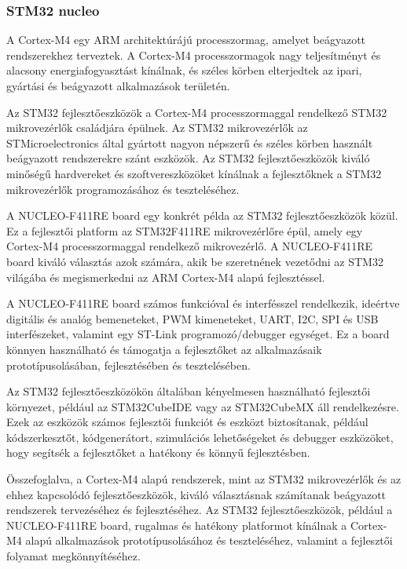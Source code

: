 \subsubsection{STM32 nucleo}
A Cortex-M4 egy ARM architektúrájú processzormag, amelyet beágyazott rendszerekhez terveztek. A Cortex-M4 processzormagok nagy teljesítményt és alacsony energiafogyasztást kínálnak, és széles körben elterjedtek az ipari, gyártási és beágyazott alkalmazások területén.

Az STM32 fejlesztőeszközök a Cortex-M4 processzormaggal rendelkező STM32 mikrovezérlők családjára épülnek. Az STM32 mikrovezérlők az STMicroelectronics által gyártott nagyon népszerű és széles körben használt beágyazott rendszerekre szánt eszközök. Az STM32 fejlesztőeszközök kiváló minőségű hardvereket és szoftvereszközöket kínálnak a fejlesztőknek a STM32 mikrovezérlők programozásához és teszteléséhez.

A NUCLEO-F411RE board egy konkrét példa az STM32 fejlesztőeszközök közül. Ez a fejlesztői platform az STM32F411RE mikrovezérlőre épül, amely egy Cortex-M4 processzormaggal rendelkező mikrovezérlő. A NUCLEO-F411RE board kiváló választás azok számára, akik be szeretnének vezetődni az STM32 világába és megismerkedni az ARM Cortex-M4 alapú fejlesztéssel.

A NUCLEO-F411RE board számos funkcióval és interfésszel rendelkezik, ideértve digitális és analóg bemeneteket, PWM kimeneteket, UART, I2C, SPI és USB interfészeket, valamint egy ST-Link programozó/debugger egységet. Ez a board könnyen használható és támogatja a fejlesztőket az alkalmazásaik prototípusolásában, fejlesztésében és tesztelésében.

Az STM32 fejlesztőeszközökön általában kényelmesen használható fejlesztői környezet, például az STM32CubeIDE vagy az STM32CubeMX áll rendelkezésre. Ezek az eszközök számos fejlesztői funkciót és eszközt biztosítanak, például kódszerkesztőt, kódgenerátort, szimulációs lehetőségeket és debugger eszközöket, hogy segítsék a fejlesztőket a hatékony és könnyű fejlesztésben.

Összefoglalva, a Cortex-M4 alapú rendszerek, mint az STM32 mikrovezérlők és az ehhez kapcsolódó fejlesztőeszközök, kiváló választásnak számítanak beágyazott rendszerek tervezéséhez és fejlesztéséhez. Az STM32 fejlesztőeszközök, például a NUCLEO-F411RE board, rugalmas és hatékony platformot kínálnak a Cortex-M4 alapú alkalmazások prototípusolásához és teszteléséhez, valamint a fejlesztői folyamat megkönnyítéséhez.


